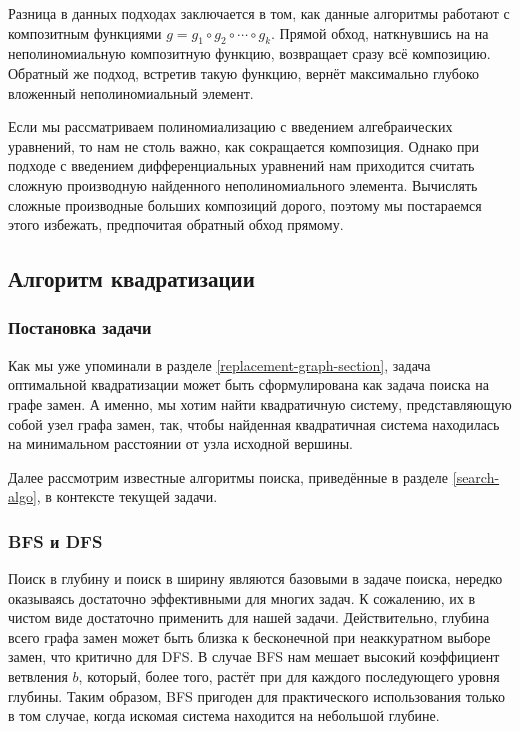 Разница в данных подходах заключается в том, как данные алгоритмы работают с композитным функциями $g = g_1 \circ g_2 \circ \cdots \circ g_k$. Прямой обход, наткнувшись на на неполиномиальную композитную функцию, возвращает сразу всё композицию. Обратный же подход, встретив такую функцию, вернёт максимально глубоко вложенный неполиномиальный элемент. 

Если мы рассматриваем полиномиализацию с введением алгебраических уравнений, то нам не столь важно, как сокращается композиция. Однако при подходе с введением дифференциальных уравнений нам приходится считать сложную производную найденного неполиномиального элемента. Вычислять сложные производные больших композиций дорого, поэтому мы постараемся этого избежать, предпочитая обратный обход прямому. 

\subsection{Алгоритм квадратизации} \label{quad-algo}

\subsubsection{Постановка задачи}

Как мы уже упоминали в разделе \ref{replacement-graph-section}, задача оптимальной квадратизации может быть сформулирована как задача поиска на графе замен. А именно, мы хотим найти квадратичную систему, представляющую собой узел графа замен, так, чтобы найденная квадратичная система находилась на минимальном расстоянии от узла исходной вершины.

Далее рассмотрим известные алгоритмы поиска, приведённые в разделе \ref{search-algo}, в контексте текущей задачи.

\subsubsection{BFS и DFS}

Поиск в глубину и поиск в ширину являются базовыми в задаче поиска, нередко оказываясь достаточно эффективными для многих задач. К сожалению, их в чистом виде достаточно применить для нашей задачи. Действительно, глубина всего графа замен может быть близка к бесконечной при неаккуратном выборе замен, что критично для DFS. В случае BFS нам мешает высокий коэффициент ветвления $b$, который, более того, растёт при для каждого последующего уровня глубины. Таким образом, BFS пригоден для практического использования только в том случае, когда искомая система находится на небольшой глубине. 

